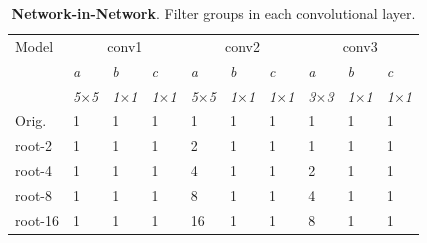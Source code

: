 \documentclass[thesis]{subfiles}
\begin{document}
	\begin{table}[tp]
		\caption[Network in Network Architectures]{\textbf{Network-in-Network}. Filter groups in each convolutional layer.}
		\label{table:ninconfig}
		\centering
		\begin{tabular}{@{}lm{1.5em}m{1.5em}m{1.5em}m{1.5em}m{1.5em}m{1.5em}m{1.5em}m{1.5em}m{1.5em}@{}}
			\toprule
			Model & \multicolumn{3}{c}{conv1} & \multicolumn{3}{c}{conv2} & \multicolumn{3}{c}{conv3} \\
			& \textit{\footnotesize a} & \textit{\footnotesize b} & \textit{\footnotesize c} & \textit{\footnotesize a} & \textit{\footnotesize b} & \textit{\footnotesize c} & \textit{\footnotesize a} & \textit{\footnotesize b} & \textit{\footnotesize c} \\
			& \textit{\footnotesize5$\times$5} & \textit{\footnotesize1$\times$1} & \textit{\footnotesize1$\times$1} & \textit{\footnotesize5$\times$5} & \textit{\footnotesize1$\times$1} & \textit{\footnotesize1$\times$1} & \textit{\footnotesize3$\times$3} & \textit{\footnotesize1$\times$1} & \textit{\footnotesize1$\times$1} \\
			Orig. & 1 & 1 & 1 & 1 & 1 & 1 & 1 & 1 & 1\\
			\midrule
			root-2 & 1 & 1 & 1 & 2 & 1 & 1 & 1 & 1 & 1\\
			root-4 & 1 & 1 & 1 & 4 & 1 & 1 & 2 & 1 & 1\\
			root-8 & 1 & 1 & 1 & 8 & 1 & 1 & 4 & 1 & 1\\
			root-16 & 1 & 1 & 1 & 16 & 1 & 1 & 8 & 1 & 1\\
			\bottomrule
		\end{tabular}
	\end{table}
\end{document}
